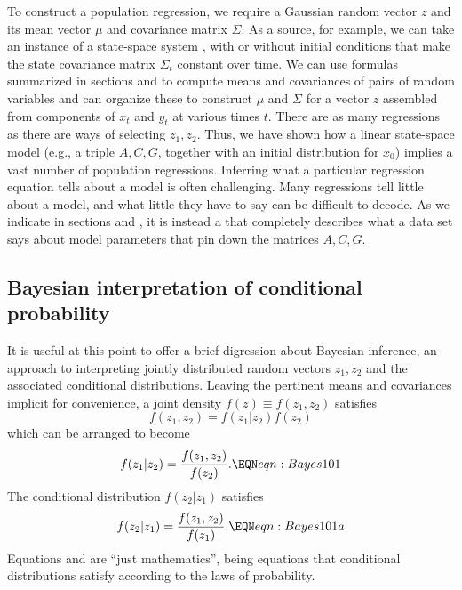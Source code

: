 To construct a  population regression, we require  a Gaussian random vector $z$ and  its mean vector $\mu$
and covariance matrix $\Sigma$. As a source, for example,  we can take an instance of a state-space system ,  with
or without initial conditions that make the state covariance matrix $\Sigma_t$ constant over time. We can use
 formulas summarized in sections  and  to compute means and covariances of  pairs
of random variables and  can organize  these  to construct $\mu$ and $\Sigma$ for a vector $z$ assembled from components of
$x_t$ and $y_t$ at various times $t$.  There are as many  regressions 
  as there are ways of selecting
$z_1, z_2$.   Thus, we have shown how a linear state-space model (e.g., a triple $A, C, G$,
together with an initial distribution for $x_0$) implies a vast number of population
regressions.    Inferring what a particular
regression equation tells about a model is often challenging. Many regressions tell little about a model, and what little they
have to say can be difficult to decode.    As we indicate in sections  and , it is instead  a  that completely describes what a  data set says about  model parameters that pin down the matrices $A, C, G$. %

%

\subsection{Bayesian interpretation of conditional probability}
It is useful at this point to offer a brief digression about Bayesian inference, an approach to interpreting  jointly distributed random vectors $z_1, z_2$ and
the
associated conditional distributions.
Leaving the pertinent means and covariances implicit for convenience, a joint density
$f(z) \equiv f(z_1, z_2)$ %
satisfies
$$ f(z_1, z_2 ) = f(z_1 | z_2)   f(z_2)  $$
which can be arranged to become
$$ f(z_1 | z_2) = {\frac{f(z_1, z_2)}{f(z_2)} } . \EQN eqn:Bayes101 $$
The conditional distribution $f(z_2|z_1)$ satisfies
$$ f(z_2 | z_1) = {\frac{f(z_1, z_2)}{f(z_1)} } . \EQN eqn:Bayes101a $$
Equations  and  are ``just mathematics'', being  equations that   conditional distributions satisfy according to the
laws of probability.
%

